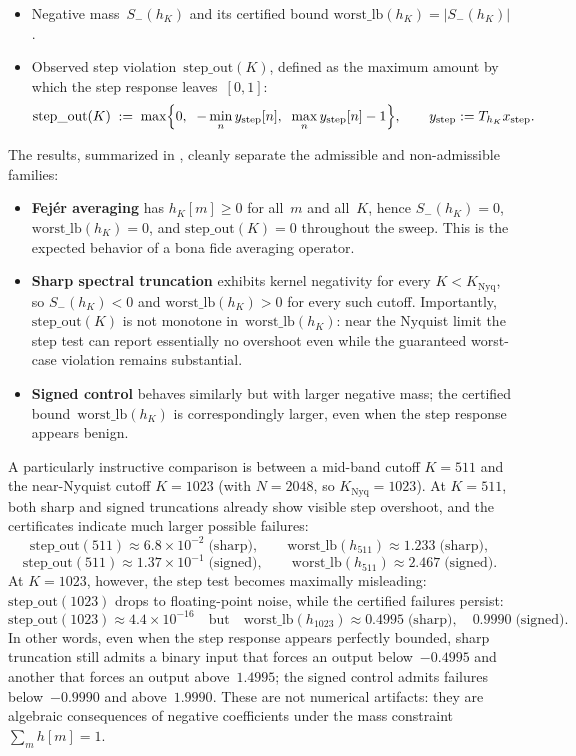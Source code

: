 \documentclass[11pt,a4paper]{article}
\theoremstyle{plain}
\theoremstyle{definition}
\theoremstyle{plain}
\newcommand{\Sminus}{S_{-}}
\newcommand{\stepout}{\mathrm{step\_out}}
\newcommand{\worstlb}{\mathrm{worst\_lb}}
\begin{document}
\begin{itemize}[leftmargin=2em]
  \item Negative mass~$\Sminus(h_K)$ and its certified bound
    $\worstlb(h_K) = |\Sminus(h_K)|$.
  \item Observed step violation~$\stepout(K)$, defined as the maximum amount by
    which the step response leaves~$[0,1]$:
    \[
      \stepout(K)
      \;:=\;
      \max\Bigl\{0,\;\;
        -\min_n y_{\mathrm{step}}[n],\;\;
        \max_n y_{\mathrm{step}}[n] - 1\Bigr\},
      \qquad
      y_{\mathrm{step}} := T_{h_K} x_{\mathrm{step}}.
    \]
\end{itemize}

The results, summarized in , cleanly separate the
admissible and non-admissible families:

\begin{itemize}[leftmargin=2em]
  \item \textbf{Fej\'er averaging} has $h_K[m] \ge 0$ for all~$m$ and all~$K$,
    hence $\Sminus(h_K) = 0$, $\worstlb(h_K) = 0$, and $\stepout(K) = 0$
    throughout the sweep.  This is the expected behavior of a bona fide averaging
    operator.
  \item \textbf{Sharp spectral truncation} exhibits kernel negativity for every
    $K < K_{\mathrm{Nyq}}$, so $\Sminus(h_K) < 0$ and $\worstlb(h_K) > 0$ for
    every such cutoff.  Importantly, $\stepout(K)$ is not monotone
    in~$\worstlb(h_K)$: near the Nyquist limit the step test can report
    essentially no overshoot even while the guaranteed worst-case violation
    remains substantial.
  \item \textbf{Signed control} behaves similarly but with larger negative mass;
    the certified bound~$\worstlb(h_K)$ is correspondingly larger, even when the
    step response appears benign.
\end{itemize}

A particularly instructive comparison is between a mid-band cutoff $K = 511$ and
the near-Nyquist cutoff $K = 1023$ (with $N = 2048$, so
$K_{\mathrm{Nyq}} = 1023$).  At $K = 511$, both sharp and signed truncations
already show visible step overshoot, and the certificates indicate much larger
possible failures:
\[
  \stepout(511) \approx 6.8 \times 10^{-2}\;\text{(sharp)},
  \qquad
  \worstlb(h_{511}) \approx 1.233\;\text{(sharp)},
\]
\[
  \stepout(511) \approx 1.37 \times 10^{-1}\;\text{(signed)},
  \qquad
  \worstlb(h_{511}) \approx 2.467\;\text{(signed)}.
\]
At $K = 1023$, however, the step test becomes maximally misleading:
$\stepout(1023)$ drops to floating-point noise, while the certified failures
persist:
\[
  \stepout(1023) \approx 4.4 \times 10^{-16}
  \quad\text{but}\quad
  \worstlb(h_{1023}) \approx 0.4995\;\text{(sharp)},
  \quad
  0.9990\;\text{(signed)}.
\]
In other words, even when the step response appears perfectly bounded, sharp
truncation still admits a binary input that forces an output below~$-0.4995$ and
another that forces an output above~$1.4995$; the signed control admits failures
below~$-0.9990$ and above~$1.9990$.  These are not numerical artifacts: they are
algebraic consequences of negative coefficients under the mass constraint
$\sum_m h[m] = 1$.
\end{document}
